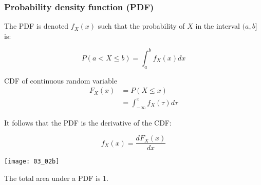 \documentclass[usenames,dvipsnames,smaller]{beamer}
\newcommand{\?}{\stackrel{?}{=}}
\newcommand{\fr}{\frac}
\begin{document}
\begin{frame}
  \frametitle{Probability density function (PDF)}\pause

  \begin{minipage}{.45\linewidth}
  The PDF is denoted $f_X(x)$ such that the probability of $X$ in the interval $(a,b]$ is: \pause

  \begin{equation}
    \label{eq:10}
    P(a< X \le b) = \int_a^b f_X(x)dx
  \end{equation}

  \pause
  
  \begin{alertblock}{CDF of continuous random variable}
    \pause
    \begin{align*}
      \label{eq:15}
      F_X(x) &=  P(X \le x)\\
             &= \int_{-\infty}^x f_X(\tau)d\tau
    \end{align*}
  \end{alertblock}

    \pause

    It follows that the PDF is the derivative of the CDF:

    \begin{equation}
      \label{eq:15}
      f_X(x) = \fr{dF_X(x)}{dx}
    \end{equation}
  \end{minipage}
  \begin{minipage}{.45\linewidth}
    \texttt{[image: 03\_02b]}
    
  \pause  
  The total area under a PDF is 1.
\end{minipage}

\end{frame}
\end{document}
